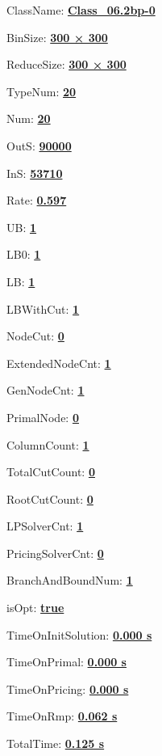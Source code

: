 \documentclass[11pt]{article}
\begin{document}
\pagestyle{empty}


ClassName: \underline{\textbf{Class_06.2bp-0}}
\par
BinSize: \underline{\textbf{300 × 300}}
\par
ReduceSize: \underline{\textbf{300 × 300}}
\par
TypeNum: \underline{\textbf{20}}
\par
Num: \underline{\textbf{20}}
\par
OutS: \underline{\textbf{90000}}
\par
InS: \underline{\textbf{53710}}
\par
Rate: \underline{\textbf{0.597}}
\par
UB: \underline{\textbf{1}}
\par
LB0: \underline{\textbf{1}}
\par
LB: \underline{\textbf{1}}
\par
LBWithCut: \underline{\textbf{1}}
\par
NodeCut: \underline{\textbf{0}}
\par
ExtendedNodeCnt: \underline{\textbf{1}}
\par
GenNodeCnt: \underline{\textbf{1}}
\par
PrimalNode: \underline{\textbf{0}}
\par
ColumnCount: \underline{\textbf{1}}
\par
TotalCutCount: \underline{\textbf{0}}
\par
RootCutCount: \underline{\textbf{0}}
\par
LPSolverCnt: \underline{\textbf{1}}
\par
PricingSolverCnt: \underline{\textbf{0}}
\par
BranchAndBoundNum: \underline{\textbf{1}}
\par
isOpt: \underline{\textbf{true}}
\par
TimeOnInitSolution: \underline{\textbf{0.000 s}}
\par
TimeOnPrimal: \underline{\textbf{0.000 s}}
\par
TimeOnPricing: \underline{\textbf{0.000 s}}
\par
TimeOnRmp: \underline{\textbf{0.062 s}}
\par
TotalTime: \underline{\textbf{0.125 s}}
\par
\newpage
\end{document}
